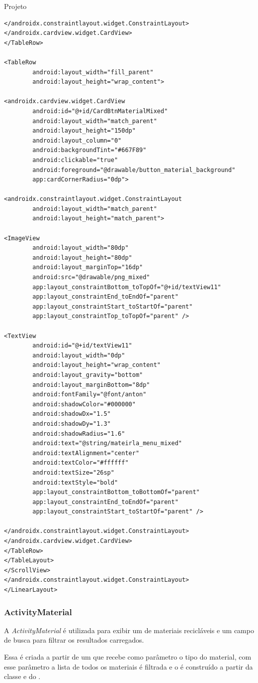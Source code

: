 \documentclass[
	12pt,				%
	openright,			%
	twoside,			%
	a4paper,			%
	english,			%
	french,				%
	spanish,			%
	brazil				%
	]{abntex2}
\begin{document}
\begin{chapter}{Projeto}
\begin{lstlisting}[numbers=none,basicstyle=\small,
caption={FragmentMaterialMenu.xml},
title={FragmentMaterialMenu.xml},
label={fragment_material_menu.xml}]
</androidx.constraintlayout.widget.ConstraintLayout>
</androidx.cardview.widget.CardView>
</TableRow>

<TableRow
		android:layout_width="fill_parent"
		android:layout_height="wrap_content">

<androidx.cardview.widget.CardView
		android:id="@+id/CardBtnMaterialMixed"
		android:layout_width="match_parent"
		android:layout_height="150dp"
		android:layout_column="0"
		android:backgroundTint="#667F89"
		android:clickable="true"
		android:foreground="@drawable/button_material_background"
		app:cardCornerRadius="0dp">

<androidx.constraintlayout.widget.ConstraintLayout
		android:layout_width="match_parent"
		android:layout_height="match_parent">

<ImageView
		android:layout_width="80dp"
		android:layout_height="80dp"
		android:layout_marginTop="16dp"
		android:src="@drawable/png_mixed"
		app:layout_constraintBottom_toTopOf="@+id/textView11"
		app:layout_constraintEnd_toEndOf="parent"
		app:layout_constraintStart_toStartOf="parent"
		app:layout_constraintTop_toTopOf="parent" />

<TextView
		android:id="@+id/textView11"
		android:layout_width="0dp"
		android:layout_height="wrap_content"
		android:layout_gravity="bottom"
		android:layout_marginBottom="8dp"
		android:fontFamily="@font/anton"
		android:shadowColor="#000000"
		android:shadowDx="1.5"
		android:shadowDy="1.3"
		android:shadowRadius="1.6"
		android:text="@string/mateirla_menu_mixed"
		android:textAlignment="center"
		android:textColor="#ffffff"
		android:textSize="26sp"
		android:textStyle="bold"
		app:layout_constraintBottom_toBottomOf="parent"
		app:layout_constraintEnd_toEndOf="parent"
		app:layout_constraintStart_toStartOf="parent" />

</androidx.constraintlayout.widget.ConstraintLayout>
</androidx.cardview.widget.CardView>
</TableRow>
</TableLayout>
</ScrollView>
</androidx.constraintlayout.widget.ConstraintLayout>
</LinearLayout>
\end{lstlisting}


\newpage
\subsubsection{ActivityMaterial} \label{ActivityMaterial}
A \textit{ActivityMaterial} é utilizada para exibir um  de materiais recicláveis e um campo de busca para filtrar os resultados carregados.

Essa  é criada a partir de um  que recebe como parâmetro o tipo do material, com esse parâmetro a lista de todos os materiais é filtrada e o  é construído a partir da classe  e do .


\end{chapter}
\end{document}
